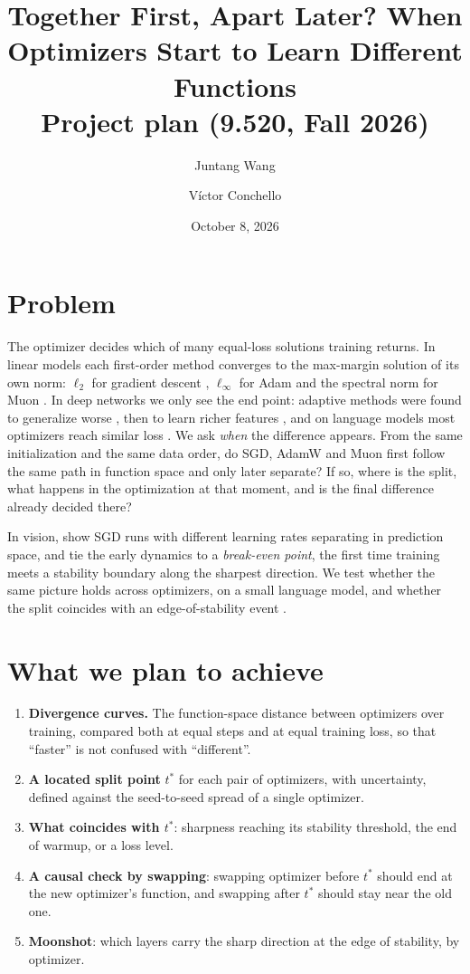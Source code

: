 \documentclass[10pt]{article}
\title{\vspace{-1.6em}Together First, Apart Later? When Optimizers Start to Learn Different Functions\\[2pt]
\large Project plan (9.520, Fall 2026)}
\author{Juntang Wang \and V\'ictor Conchello}
\date{October 8, 2026}
\begin{document}
\maketitle
\vspace{-1.5em}

\section{Problem}

The optimizer decides which of many equal-loss solutions training returns. In linear models each
first-order method converges to the max-margin solution of its own norm: $\ell_2$ for gradient descent
\citep{soudry2018separable}, $\ell_\infty$ for Adam \citep{zhang2024adam} and the spectral norm for Muon
\citep{fan2025spectral}. In deep networks we only see the end point: adaptive methods were found to
generalize worse \citep{wilson2017marginal}, then to learn richer features \citep{vasudeva2025rich}, and
on language models most optimizers reach similar loss \citep{zhao2025deconstructing}. We ask
\emph{when} the difference appears. From the same initialization and the same data order, do SGD,
AdamW and Muon first follow the same path in function space and only later separate? If so, where is
the split, what happens in the optimization at that moment, and is the final difference already
decided there?

In vision, \citet{jastrzebski2020breakeven} show SGD runs with different learning rates separating in
prediction space, and tie the early dynamics to a \emph{break-even point}, the first time training
meets a stability boundary along the sharpest direction. We test whether the same picture holds across optimizers, on a small language
model, and whether the split coincides with an edge-of-stability event
\citep{cohen2021eos,cohen2022adaptive,andreyev2024eoss}.

\section{What we plan to achieve}

\begin{enumerate}
\item \textbf{Divergence curves.} The function-space distance between optimizers over training, compared
both at equal steps and at equal training loss, so that ``faster'' is not confused with ``different''.
\item \textbf{A located split point} $t^\ast$ for each pair of optimizers, with uncertainty, defined
against the seed-to-seed spread of a single optimizer.
\item \textbf{What coincides with $t^\ast$}: sharpness reaching its stability threshold, the end of
warmup, or a loss level.
\item \textbf{A causal check by swapping}: swapping optimizer before $t^\ast$ should end at the new
optimizer's function, and swapping after $t^\ast$ should stay near the old one.
\item \textbf{Moonshot}: which layers carry the sharp direction at the edge of stability, by optimizer.
\end{enumerate}
\end{document}
